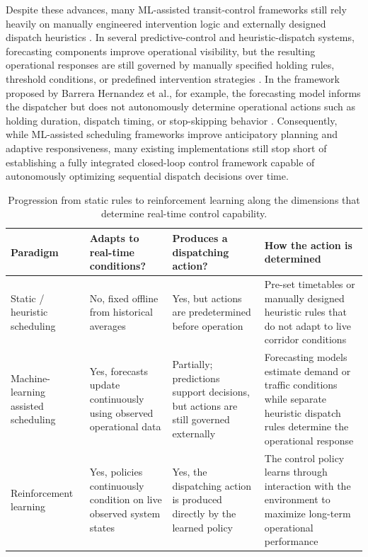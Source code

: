 Despite these advances, many ML-assisted transit-control frameworks still rely heavily on manually engineered intervention logic and externally designed dispatch heuristics \cite{alexandre2023}. In several predictive-control and heuristic-dispatch systems, forecasting components improve operational visibility, but the resulting operational responses are still governed by manually specified holding rules, threshold conditions, or predefined intervention strategies \cite{pang2019,Barrera2025Optimization}. In the framework proposed by Barrera Hernandez et al., for example, the forecasting model informs the dispatcher but does not autonomously determine operational actions such as holding duration, dispatch timing, or stop-skipping behavior \cite{Barrera2025Optimization}. Consequently, while ML-assisted scheduling frameworks improve anticipatory planning and adaptive responsiveness, many existing implementations still stop short of establishing a fully integrated closed-loop control framework capable of autonomously optimizing sequential dispatch decisions over time.

\begin{table}[htbp]
\centering
\caption{Progression from static rules to reinforcement learning along the dimensions that determine real-time control capability.}
\label{tab:control_paradigms}

\footnotesize
\renewcommand{\arraystretch}{1.3}

\begin{tabularx}{\textwidth}{
>{\RaggedRight\arraybackslash}p{2.8cm}
>{\RaggedRight\arraybackslash}p{3.5cm}
>{\RaggedRight\arraybackslash}p{3.5cm}
>{\RaggedRight\arraybackslash}X
}
\toprule
\textbf{Paradigm} & 
\textbf{Adapts to real-time conditions?} & 
\textbf{Produces a dispatching action?} & 
\textbf{How the action is determined} \\
\midrule

Static / heuristic scheduling & 
No, fixed offline from historical averages & 
Yes, but actions are predetermined before operation & 
Pre-set timetables or manually designed heuristic rules that do not adapt to live corridor conditions \cite{Ceder2007,Daganzo2009} \\

Machine-learning assisted scheduling & 
Yes, forecasts update continuously using observed operational data & 
Partially; predictions support decisions, but actions are still governed externally & 
Forecasting models estimate demand or traffic conditions while separate heuristic dispatch rules determine the operational response \cite{Barrera2025Optimization,Usman2025ML,pang2019} \\

Reinforcement learning & 
Yes, policies continuously condition on live observed system states & 
Yes, the dispatching action is produced directly by the learned policy & 
The control policy learns through interaction with the environment to maximize long-term operational performance \cite{Momenikorbekandi2023Intelligent,Rodriguez2023Cooperative,Wangsun} \\

\bottomrule
\end{tabularx}
\end{table}

